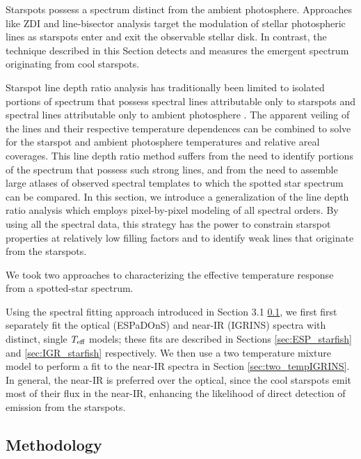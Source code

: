 \documentclass[twocolumn]{emulateapj}%
\begin{document}
Starspots possess a spectrum distinct from the ambient photosphere.  Approaches like ZDI and line-bisector analysis \citep[\emph{e.g.}][]{prato08, donati14} target the modulation of stellar photospheric lines as starspots enter and exit the observable stellar disk.  In contrast, the technique described in this Section detects and measures the emergent spectrum originating from cool starspots.

Starspot line depth ratio analysis has traditionally been limited to isolated portions of spectrum that possess spectral lines attributable only to starspots and spectral lines attributable only to ambient photosphere \citep[\emph{e.g.}][]{neff95, oneal01}.  The apparent veiling of the lines and their respective temperature dependences can be combined to solve for the starspot and ambient photosphere temperatures and relative areal coverages.  This line depth ratio method suffers from the need to identify portions of the spectrum that possess such strong lines, and from the need to assemble large atlases of observed spectral templates to which the spotted star spectrum can be compared.  In this section, we introduce a generalization of the line depth ratio analysis which employs pixel-by-pixel modeling of all spectral orders.  By using all the spectral data, this strategy has the power to constrain starspot properties at relatively low filling factors and to identify weak lines that originate from the starspots.

We took two approaches to characterizing the effective temperature response from a spotted-star spectrum.  

Using the spectral fitting approach introduced in Section 3.1 \ref{sec:methods}, we first first separately fit the optical (ESPaDOnS) and near-IR (IGRINS) spectra with distinct, single $T_\textrm{eff}$ models; these fits are described in Sections \ref{sec:ESP_starfish} and \ref{sec:IGR_starfish} respectively.  We then use a two temperature mixture model to perform a fit to the near-IR spectra in Section \ref{sec:two_tempIGRINS}.  In general, the near-IR is preferred over the optical, since the cool starspots emit most of their flux in the near-IR, enhancing the likelihood of direct detection of emission from the starspots.


\subsection{Methodology}\label{sec:methods} 
\end{document}
